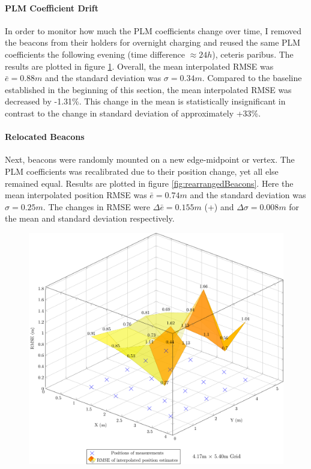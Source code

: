 \documentclass[a4paper, oneside]{ipsreport}
\begin{document}
\paragraph{PLM Coefficient Drift}
In order to monitor how much the PLM coefficients change over time, I removed the beacons from their holders for overnight charging and reused the same PLM coefficients the following evening (time difference $\approx 24h$), ceteris paribus. The results are plotted in figure \ref{fig:reusedCoefficients}. Overall, the mean interpolated RMSE was  $\bar{e} = 0.88m$  and the standard deviation was $\sigma = 0.34m$. Compared to the baseline established in the beginning of this section, the mean interpolated RMSE was decreased by -1.31\%. This change in the mean is statistically insignificant in contrast to the change in standard deviation of approximately +33\%.

\paragraph{Relocated Beacons}
Next, beacons were randomly mounted on a new edge-midpoint or vertex. The PLM coefficients was recalibrated due to their position change, yet all else remained equal. Results are plotted in figure \ref{fig:rearrangedBeacons}. Here the mean interpolated position RMSE was $\bar{e} = 0.74m$ and the standard deviation was $\sigma = 0.25m$. The changes in RMSE were $\Delta\bar{e} = 0.155m$ (+) and $\Delta\sigma = 0.008m$ for the mean and standard deviation respectively.

\begin{figure}[H]
	\centering
	\includegraphics[width=0.8\linewidth]{./figures/rmse/reusedCoefficients.pdf}
	\label{fig:reusedCoefficients}
\end{figure}
\end{document}
